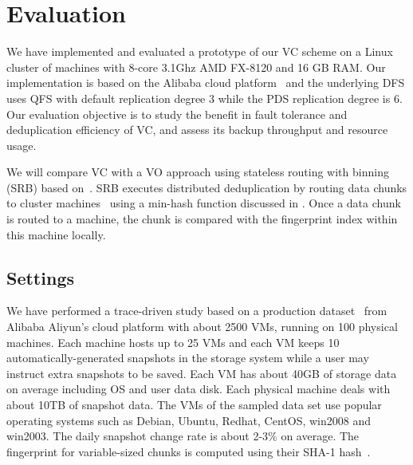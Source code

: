 \section{Evaluation}
\label{sect:evaluation}
We have implemented and evaluated a prototype of our VC scheme on a Linux cluster of machines with
8-core 3.1Ghz AMD FX-8120 and 16 GB RAM. 
Our implementation is based on the Alibaba cloud platform~\cite{Aliyun,WeiZhangIEEE}
and the underlying DFS uses  QFS with default replication degree 3 while the PDS replication degree is 6.
Our evaluation objective is to
study the benefit in fault tolerance and   deduplication efficiency of VC,  
and assess its backup throughput and  resource usage. 

We will compare VC with a VO approach  using stateless routing with binning (SRB) 
based on~\cite{Dong2011,extreme_binning09}.
SRB executes distributed deduplication by routing data chunks to cluster machines~\cite{Dong2011}
using  a min-hash function discussed in \cite{extreme_binning09}. Once a data chunk is routed to
a machine, the chunk is compared with the fingerprint index within this machine locally. 

\subsection{Settings}
We have performed a trace-driven study based on a production dataset~\cite{WeiZhangIEEE} from 
Alibaba Aliyun's cloud platform with about 2500 VMs, running on 100 physical machines. 
Each machine hosts up to 25 VMs and each VM keeps 10 automatically-generated snapshots in the storage 
system while a user may instruct extra snapshots to be saved.
Each VM has about 40GB of storage  data  on average
including OS and user data disk.
Each physical machine deals with about 10TB of snapshot data.
The VMs of the sampled data set use popular operating systems such as 
Debian, Ubuntu, Redhat, CentOS, win2008 and win2003. 
The daily snapshot change rate is about 2-3\% on average.
The fingerprint for variable-sized chunks is computed using their SHA-1 hash~\cite{similar94,rabin81}. 

